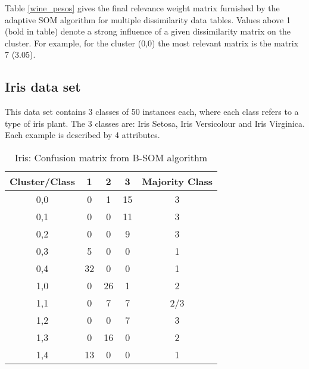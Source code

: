 \documentclass[10pt, conference, compsocconf]{IEEEtran}
\begin{document}

Table \ref{wine_pesos} gives the final relevance weight matrix furnished by the adaptive SOM algorithm for multiple dissimilarity data tables. Values above 1 (bold in table) denote a strong influence of a given dissimilarity matrix on the cluster. For example, for the cluster (0,0) the most relevant matrix is the matrix 7 (3.05).

\subsection{Iris data set}

This data set contains 3 classes of 50 instances each, where each class refers to a type of iris plant. The 3 classes are: Iris Setosa, Iris Versicolour and Iris Virginica. Each example is described by 4 attributes.

\begin{table}[!h]
\renewcommand{\arraystretch}{1.2}
\begin{center}
\caption{Iris: Confusion matrix from B-SOM algorithm}
\begin{tabular}{|c|c|c|c||c|}
\hline
Cluster/Class & 1 & 2 & 3 & Majority Class\\ \hline
0,0 & 0 & 1 & 15 & 3\\ \hline
0,1 & 0 & 0 & 11 & 3\\ \hline
0,2 & 0 & 0 & 9 & 3\\ \hline
0,3 & 5 & 0 & 0 & 1\\ \hline
0,4 & 32 & 0 & 0 & 1\\ \hline \hline
1,0 & 0 & 26 & 1 & 2\\ \hline
1,1 & 0 & 7 & 7 & 2/3\\ \hline
1,2 & 0 & 0 & 7 & 3\\ \hline
1,3 & 0 & 16 & 0 & 2\\ \hline
1,4 & 13 & 0 & 0 & 1\\ \hline
\end{tabular}
\label{iris_batch}
\end{center}
\end{table}
\end{document}
